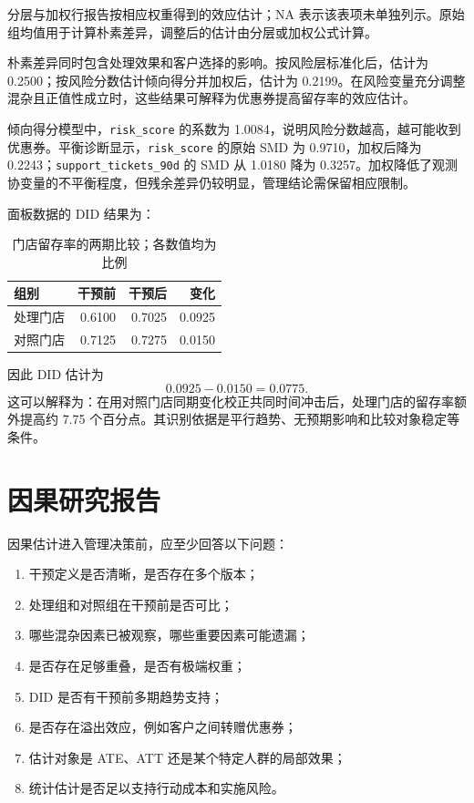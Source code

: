 分层与加权行报告按相应权重得到的效应估计；NA 表示该表项未单独列示。原始组均值用于计算朴素差异，调整后的估计由分层或加权公式计算。

朴素差异同时包含处理效果和客户选择的影响。按风险层标准化后，估计为 0.2500；按风险分数估计倾向得分并加权后，估计为 0.2199。在风险变量充分调整混杂且正值性成立时，这些结果可解释为优惠券提高留存率的效应估计。

倾向得分模型中，\texttt{risk\_score} 的系数为 1.0084，说明风险分数越高，越可能收到优惠券。平衡诊断显示，\texttt{risk\_score} 的原始 SMD 为 0.9710，加权后降为 0.2243；\texttt{support\_tickets\_90d} 的 SMD 从 1.0180 降为 0.3257。加权降低了观测协变量的不平衡程度，但残余差异仍较明显，管理结论需保留相应限制。

面板数据的 DID 结果为：
\begin{table}[htbp]
\centering
\caption{门店留存率的两期比较；各数值均为比例}
\begin{tabular}{lrrr}
\toprule
\rowcolor{BDMTableHead}
组别 & 干预前 & 干预后 & 变化\\
\midrule
处理门店 & 0.6100 & 0.7025 & 0.0925\\
对照门店 & 0.7125 & 0.7275 & 0.0150\\
\bottomrule
\end{tabular}
\end{table}
因此 DID 估计为
\[
  0.0925-0.0150=0.0775.
\]
这可以解释为：在用对照门店同期变化校正共同时间冲击后，处理门店的留存率额外提高约 7.75 个百分点。其识别依据是平行趋势、无预期影响和比较对象稳定等条件。

\section{因果研究报告}

因果估计进入管理决策前，应至少回答以下问题：
\begin{enumerate}
  \item 干预定义是否清晰，是否存在多个版本；
  \item 处理组和对照组在干预前是否可比；
  \item 哪些混杂因素已被观察，哪些重要因素可能遗漏；
  \item 是否存在足够重叠，是否有极端权重；
  \item DID 是否有干预前多期趋势支持；
  \item 是否存在溢出效应，例如客户之间转赠优惠券；
  \item 估计对象是 ATE、ATT 还是某个特定人群的局部效果；
  \item 统计估计是否足以支持行动成本和实施风险。
\end{enumerate}

